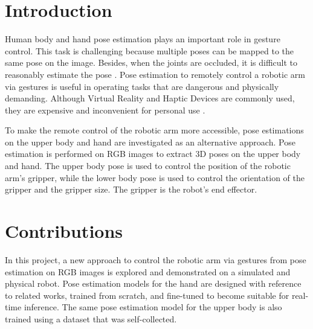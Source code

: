 \section{Introduction}

\noindent
Human body and hand pose estimation plays an important role in gesture control. This task is challenging because multiple poses can be mapped to the same pose on the image. Besides, when the joints are occluded, it is difficult to reasonably estimate the pose \cite{poseestimationreview}. Pose estimation to remotely control a robotic arm via gestures is useful in operating tasks that are dangerous and physically demanding. Although Virtual Reality and Haptic Devices are commonly used, they are expensive and inconvenient for personal use \cite{shadowrobot, teleexistence}.

\noindent
To make the remote control of the robotic arm more accessible, pose estimations on the upper body and hand are investigated as an alternative approach. Pose estimation is performed on RGB images to extract 3D poses on the upper body and hand. The upper body pose is used to control the position of the robotic arm's gripper, while the lower body pose is used to control the orientation of the gripper and the gripper size. The gripper is the robot's end effector.

\section{Contributions}

\noindent
In this project, a new approach to control the robotic arm via gestures from pose estimation on RGB images is explored and demonstrated on a simulated and physical robot. Pose estimation models for the hand are designed with reference to related works, trained from scratch, and fine-tuned to become suitable for real-time inference. The same pose estimation model for the upper body is also trained using a dataset that was self-collected.
